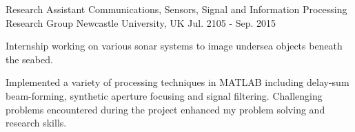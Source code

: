 \begin{cventries}
    \cventry
        {Research Assistant}
        {Communications, Sensors, Signal and Information Processing Research Group}
        {Newcastle University, UK}
        {Jul. 2105 - Sep. 2015}
        {
            \begin{cvitems}
                \item{Internship working on various sonar systems to image undersea objects beneath the seabed.}
                \item{Implemented a variety of processing techniques in MATLAB including delay-sum beam-forming, synthetic aperture focusing and signal filtering. Challenging problems encountered during the project enhanced my problem solving and research skills.}
            \end{cvitems}
        }
        \vspace{-0.2cm}

\end{cventries}
